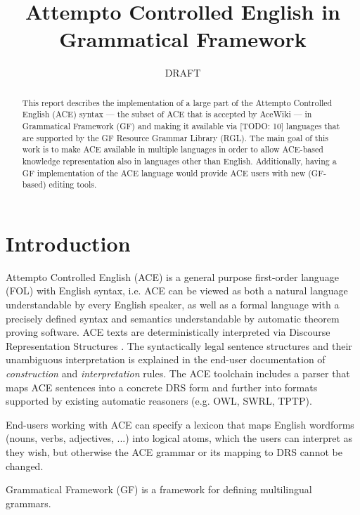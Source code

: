 \documentclass[a4paper]{article}
\newcommand\ace{Attempto Controlled English}
\begin{document}
\title{Attempto Controlled English in Grammatical Framework}
\author{DRAFT}


\maketitle
\begin{abstract}
This report describes the implementation of a large part of the
Attempto Controlled English (ACE) syntax ---
the subset of ACE that is accepted by AceWiki ---
in Grammatical Framework (GF) and making it available via [TODO: 10]
languages that are supported by the GF Resource Grammar Library (RGL).
The main goal of this work is to make ACE available in multiple languages
in order to allow
ACE-based knowledge representation also in languages other than English.
Additionally, having a GF implementation of the ACE language would provide
ACE users with new (GF-based) editing tools.
\end{abstract}

\section{Introduction}

\ace{} (ACE) \cite{fuchs:reasoningweb2008}
is a general purpose
first-order language (FOL)
with English syntax,
i.e. ACE can be viewed as both a natural language understandable by every
English speaker, as well as a formal language with a precisely defined
syntax and semantics understandable by automatic theorem proving software.
ACE texts are deterministically interpreted
via Discourse Representation Structures \cite{kamp:drt1993}.
The syntactically legal sentence structures and their
unambiguous interpretation is explained in the end-user documentation of
\emph{construction} and \emph{interpretation} rules.
The ACE toolchain includes a parser that maps ACE sentences into a concrete
DRS form \cite{ifi-2010.0010} and further into formats supported by existing
automatic reasoners (e.g. OWL, SWRL, TPTP).

End-users working with ACE can specify a lexicon that maps English
wordforms (nouns, verbs, adjectives, ...) into logical atoms, which the users
can interpret as they wish, but otherwise the ACE grammar or its mapping to
DRS cannot be changed.

Grammatical Framework (GF) \cite{ranta:book2011}
is a framework for defining multilingual grammars.
\end{document}
